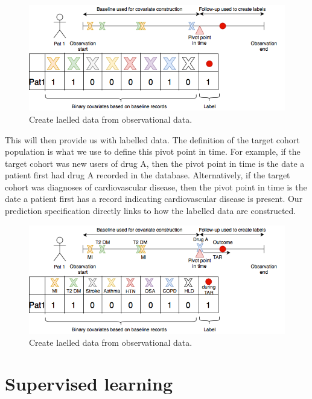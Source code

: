 \documentclass[11pt]{book}
\theoremstyle{definition}
\theoremstyle{definition}
\theoremstyle{definition}
\theoremstyle{remark}
\begin{document}
\begin{figure}
\includegraphics[width=1\linewidth]{images/PatientLevelPrediction/theory/dataplot1} \caption{Create laelled data from observational data.}\label{fig:figuretheory2}
\end{figure}

This will then provide us with labelled data. The definition of the target cohort population is what we use to define this pivot point in time. For example, if the target cohort was new users of drug A, then the pivot point in time is the date a patient first had drug A recorded in the database. Alternatively, if the target cohort was diagnoses of cardiovascular disease, then the pivot point in time is the date a patient first has a record indicating cardiovascular disease is present. Our prediction specification directly links to how the labelled data are constructed.

\begin{figure}
\includegraphics[width=1\linewidth]{images/PatientLevelPrediction/theory/dataplot2} \caption{Create laelled data from observational data.}\label{fig:figuretheory3}
\end{figure}

\hypertarget{supervised}{%
\section{Supervised learning}\label{supervised}}
\end{document}
